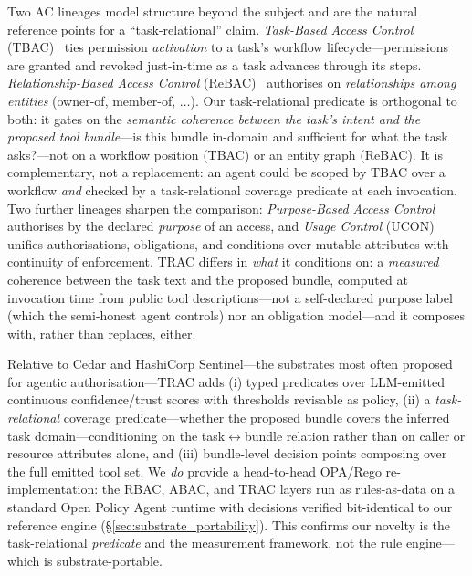 \documentclass[sigconf,review,anonymous]{acmart}
\begin{document}
Two AC lineages model structure beyond the subject and are the natural reference points for a ``task-relational'' claim. \emph{Task-Based Access Control} (TBAC)~\cite{thomas1997tbac} ties permission \emph{activation} to a task's workflow lifecycle---permissions are granted and revoked just-in-time as a task advances through its steps. \emph{Relationship-Based Access Control} (ReBAC)~\cite{fong2011rebac} authorises on \emph{relationships among entities} (owner-of, member-of, $\dots$). Our task-relational predicate is orthogonal to both: it gates on the \emph{semantic coherence between the task's intent and the proposed tool bundle}---is this bundle in-domain and sufficient for what the task asks?---not on a workflow position (TBAC) or an entity graph (ReBAC). It is complementary, not a replacement: an agent could be scoped by TBAC over a workflow \emph{and} checked by a task-relational coverage predicate at each invocation. Two further lineages sharpen the comparison: \emph{Purpose-Based Access Control}~\cite{byun2005purpose} authorises by the declared \emph{purpose} of an access, and \emph{Usage Control} (UCON)~\cite{park2004ucon} unifies authorisations, obligations, and conditions over mutable attributes with continuity of enforcement. TRAC differs in \emph{what} it conditions on: a \emph{measured} coherence between the task text and the proposed bundle, computed at invocation time from public tool descriptions---not a self-declared purpose label (which the semi-honest agent controls) nor an obligation model---and it composes with, rather than replaces, either.

Relative to Cedar and HashiCorp Sentinel---the substrates most often proposed for agentic authorisation---TRAC adds (i) typed predicates over LLM-emitted continuous confidence/trust scores with thresholds revisable as policy, (ii) a \emph{task-relational} coverage predicate---whether the proposed bundle covers the inferred task domain---conditioning on the task$\leftrightarrow$bundle relation rather than on caller or resource attributes alone, and (iii) bundle-level decision points composing over the full emitted tool set. We \emph{do} provide a head-to-head OPA/Rego re-implementation: the RBAC, ABAC, and TRAC layers run as rules-as-data on a standard Open Policy Agent runtime with decisions verified bit-identical to our reference engine (\S\ref{sec:substrate_portability}). This confirms our novelty is the task-relational \emph{predicate} and the measurement framework, not the rule engine---which is substrate-portable.
\end{document}
